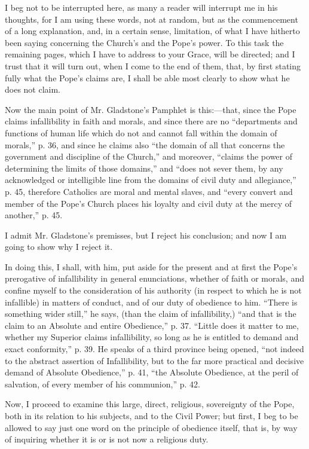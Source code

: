 I beg not to be interrupted here, as many a reader will interrupt me
in his thoughts, for I am using these words, not at random, but as the
commencement of a long explanation, and, in a certain sense, limitation,
of what I have hitherto been saying concerning the Church's and the
Pope's power. To this task the remaining pages, which I have to address
to your Grace, will be directed; and I trust that it will turn out, when
I come to the end of them, that, by first stating fully what the Pope's
claims are, I shall be able most clearly to show what he does not
claim.

Now the main point of Mr. Gladstone's Pamphlet is this:—that, since
the Pope claims infallibility in faith and morals, and since there are
no ``departments and functions of human life which do not and cannot
fall within the domain of morals,'' p. 36, and since he claims also
``the domain of all that concerns the government and discipline of
the Church,'' and moreover, ``claims the power of determining
the limits of those domains,'' and ``does not sever them, by any
acknowledged or intelligible line from the domains of civil duty and
allegiance,'' p. 45, therefore Catholics are moral and mental
slaves, and ``every convert and member of the Pope's Church places
his loyalty and civil duty at the mercy of another,'' p. 45.

I admit Mr. Gladstone's premisses, but I reject his conclusion; and
now I am going to show why I reject it.

In doing this, I shall, with him, put aside for the present and at
first the Pope's prerogative of infallibility in general enunciations,
whether of faith or morals, and confine myself to the consideration of
his authority (in respect to which he is not infallible) in matters of
conduct, and of our duty of obedience to him. ``There is something
wider still,'' he says, (than the claim of infallibility,) ``and
that is the claim to an Absolute and entire Obedience,'' p. 37.
``Little does it matter to me, whether my Superior claims
infallibility, so long as he is entitled to demand and exact
conformity,'' p. 39. He speaks of a third province being opened,
``not indeed to the abstract assertion of Infallibility, but
to the far more practical and decisive demand of Absolute
Obedience,'' p. 41, ``the Absolute Obedience, at the peril of
salvation, of every member of his communion,'' p. 42.

Now, I proceed to examine this large, direct, religious, sovereignty
of the Pope, both in its relation to his subjects, and to the Civil
Power; but first, I beg to be allowed to say just one word on the
principle of obedience itself, that is, by way of inquiring whether it
is or is not now a religious duty.

